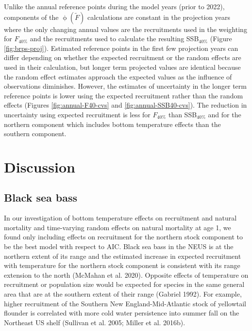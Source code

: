 \documentclass[
]{article}
\begin{document}
Unlike the annual reference points during the model years (prior to
2022), components of the \(\upphi(\widetilde{F})\) calculations are
constant in the projection years where the only changing annual values
are the recruitments used in the weighting for \(F_{40\%}\) and the
recruitments used to calculate the resulting SSB\(_{40\%}\) (Figure
\ref{fig:brps-proj}). Estimated reference points in the first few
projection years can differ depending on whether the expected
recruitment or the random effects are used in their calculation, but
longer term projected values are identical because the random effect
estimates approach the expected values as the influence of observations
diminishes. However, the estimates of uncertainty in the longer term
reference points is lower using the expected recruitment rather than the
random effects (Figures \ref{fig:annual-F40-cvs} and
\ref{fig:annual-SSB40-cvs}). The reduction in uncertainty using expected
recruitment is less for \(F_{40\%}\) than SSB\(_{40\%}\) and for the
northern component which includes bottom temperature effects than the
southern component.

\hypertarget{discussion}{%
\section*{Discussion}\label{discussion}}

\hypertarget{black-sea-bass}{%
\subsection*{Black sea bass}\label{black-sea-bass}}

In our investigation of bottom temperature effects on recruitment and
natural mortality and time-varying random effects on natural mortality
at age 1, we found only including effects on recruitment for the
northern stock component to be the best model with respect to AIC. Black
sea bass in the NEUS is at the northern extent of its range and the
estimated increase in expected recruitment with temperature for the
northern stock component is consistent with its range extension to the
north (McMahan et al. 2020). Opposite effects of temperature on
recruitment or population size would be expected for species in the same
general area that are at the southern extent of their range (Gabriel
1992). For example, higher recruitment of the Southern New
England-Mid-Atlantic stock of yellowtail flounder is correlated with
more cold water persistence into summer fall on the Northeast US shelf
(Sullivan et al. 2005; Miller et al. 2016b).
\end{document}
